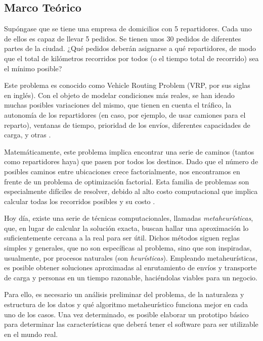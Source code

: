 \documentclass[12pt]{extarticle}
\begin{document}
\subsection{Marco Teórico}
Supóngase que se tiene una empresa de domicilios con 5 repartidores. Cada uno
de ellos es capaz de llevar 5 pedidos. Se tienen unos 30 pedidos de diferentes
partes de la ciudad. ¿Qué pedidos deberán asignarse a qué repartidores, de modo
que el total de kilómetros recorridos por todos (o el tiempo total de recorrido)
sea el mínimo posible?

Este problema es conocido como Vehicle Routing Problem (VRP, por sus siglas en
inglés). Con el objeto de modelar condiciones más reales, se han ideado muchas
posibles variaciones del mismo, que tienen en cuenta el tráfico, la autonomía de
los repartidores (en caso, por ejemplo, de usar camiones para el reparto),
ventanas de tiempo, prioridad de los envíos, diferentes capacidades de carga, y
otras \cite{caceres-cruz_rich_2015}.

Matemáticamente, este problema implica encontrar una serie de caminos (tantos
como repartidores haya) que pasen por todos los destinos. Dado que el número de
posibles caminos entre ubicaciones crece factorialmente, nos encontramos en
frente de un problema de optimización factorial. Esta familia de problemas son
especialmente difíciles de resolver, debido al alto costo computacional que
implica calcular todas los recorridos posibles y su costo \cite{toth_paolo_vehicle_2002}.

Hoy día, existe una serie de técnicas computacionales, llamadas
\textit{metaheurísticas}, que, en lugar de calcular la solución exacta, buscan
hallar una aproximación lo suficientemente cercana a la real para ser útil.
Dichos métodos siguen reglas simples y generales, que no son específicas al
problema, sino que son inspiradas, usualmente, por procesos naturales
(son \textit{heurísticas}). Empleando metaheurísticas, es posible obtener
soluciones aproximadas al enrutamiento de envíos y transporte de carga y
personas en un tiempo razonable, haciéndolas viables para un negocio.

Para ello, es necesario un análisis preliminar del problema, de la naturaleza y
estructura de los datos y qué algoritmo metaheurístico funciona mejor en cada
uno de los casos. Una vez determinado, es posible elaborar un prototipo básico
para determinar las características que deberá tener el software para ser
utilizable en el mundo real.
\end{document}
